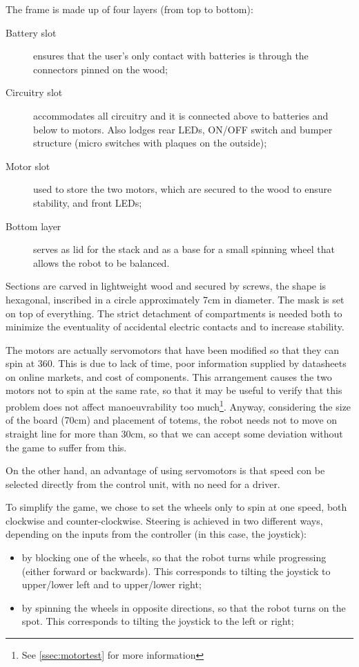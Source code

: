 \documentclass[a4paper,twoside]{book}
\begin{document}
\beforelist The frame is made up of four layers (from top to bottom):
\begin{description}
\item[Battery slot] ensures that the user's only contact with batteries is through the connectors pinned on the wood;
\item[Circuitry slot] accommodates all circuitry and it is connected above to batteries and below to motors. Also lodges rear LEDs, ON/OFF switch and bumper structure (micro switches with plaques on the outside);
\item[Motor slot] used to store the two motors, which are secured to the wood to ensure stability, and front LEDs;
\item[Bottom layer] serves as lid for the stack and as a base for a small spinning wheel that allows the robot to be balanced.
\end{description}
\afterlist*
Sections are carved in lightweight wood and secured by screws, the shape is hexagonal, inscribed in a circle approximately 7cm in diameter. The mask is set on top of everything. The strict detachment of compartments is needed both to minimize the eventuality of accidental electric contacts and to increase stability.

The motors are actually servomotors that have been modified so that they can spin at 360\degree. This is due to lack of time, poor information supplied by datasheets on online markets, and cost of components. This arrangement causes the two motors not to spin at the same rate, so that it may be useful to verify that this problem does not affect manoeuvrability too much\footnote{See \autoref{ssec:motortest} for more
information}.
Anyway, considering the size of the board (70cm) and placement of totems, the robot needs not to move on straight line for more than 30cm, so that we can accept some deviation without the game to suffer from this.

On the other hand, an advantage of using servomotors is that speed con be selected directly from the control unit, with no need for a driver.

\beforelist* To simplify the game, we chose to set the wheels only to spin at one speed, both clockwise and counter-clockwise. Steering is achieved in two different ways, depending on the inputs from the controller (in this case, the joystick):
\begin{itemize}
\item by blocking one of the wheels, so that the robot turns while progressing (either forward or backwards). This corresponds to tilting the joystick to upper/lower left and to upper/lower right;
\item by spinning the wheels in opposite directions, so that the robot turns on the spot. This corresponds to tilting the joystick to the left or right;
\end{itemize}
\afterlist*
\end{document}
